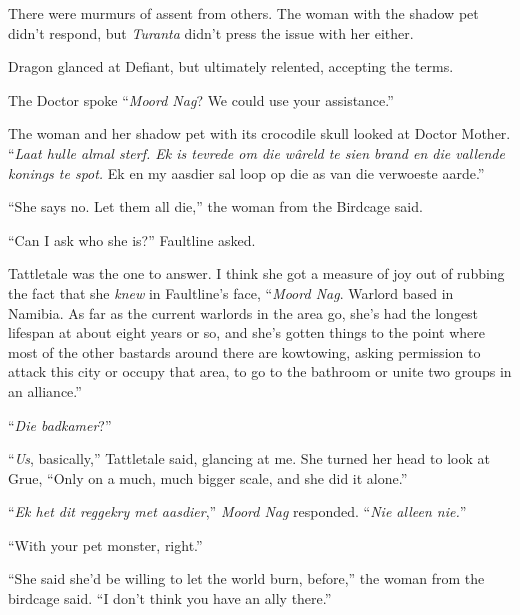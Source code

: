 There were murmurs of assent from others.  The woman with the shadow pet didn't respond, but \emph{Turanta }didn't press the issue with her either.



Dragon glanced at Defiant, but ultimately relented, accepting the terms.



The Doctor spoke ``\emph{Moord Nag}?  We could use your assistance.''



The woman and her shadow pet with its crocodile skull looked at Doctor Mother.  ``\emph{Laat hulle almal sterf.  Ek is tevrede om die w\^{a}reld te sien brand en die vallende konings te spot.  }Ek en my aasdier sal loop op die as van die verwoeste aarde.''



``She says no.  Let them all die,'' the woman from the Birdcage said.



``Can I ask who she is?'' Faultline asked.



Tattletale was the one to answer.  I think she got a measure of joy out of rubbing the fact that she \emph{knew} in Faultline's face, ``\emph{Moord Nag}.  Warlord based in Namibia.  As far as the current warlords in the area go, she's had the longest lifespan at about eight years or so, and she's gotten things to the point where most of the other bastards around there are kowtowing, asking permission to attack this city or occupy that area, to go to the bathroom or unite two groups in an alliance.''



``\emph{Die badkamer}?''



``\emph{Us}, basically,'' Tattletale said, glancing at me.  She turned her head to look at Grue, ``Only on a much, much bigger scale, and she did it alone.''



``\emph{Ek het dit reggekry met aasdier},'' \emph{Moord Nag} responded.  ``\emph{Nie alleen nie.}''



``With your pet monster, right.''



``She said she'd be willing to let the world burn, before,'' the woman from the birdcage said.  ``I don't think you have an ally there.''



